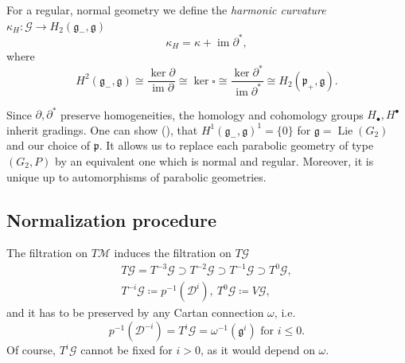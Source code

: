 \documentclass{amsart}
\theoremstyle{plain}
\theoremstyle{definition}
\theoremstyle{remark}
\newcommand{\mc}[1]{\mathcal{#1}}
\newcommand{\mfk}[1]{\mathfrak{#1}}
\newcommand{\on}[1]{\operatorname{#1}}
\begin{document}
For a regular, normal geometry we define the \emph{harmonic curvature} $\kappa_H\colon \mc{G} \to H_2(\mfk{g}_-,\mfk{g})$
\begin{equation}
    \kappa_H = \kappa + \on{im} \partial^*,
\end{equation}
where
\begin{equation*}
    H^2(\mfk{g}_-,\mfk{g}) \cong \frac{\ker \partial}{\on{im} \partial} \cong \ker \square \cong \frac{\ker \partial^*}{\on{im} \partial^*} \cong H_2(\mfk{p}_+,\mfk{g}).
\end{equation*}

Since $\partial,\partial^*$ preserve homogeneities, the homology and cohomology groups $H_\bullet, H^\bullet$ inherit gradings. One can show (\cite[p.]{dt2022}), that $H^1(\mfk{g}_-, \mfk{g})^1 = \{0\}$ for $\mfk{g} = \on{Lie}(G_2)$ and our choice of $\mfk{p}$. It allows us to replace each parabolic geometry of type $(G_2,P)$ by an equivalent one which is normal and regular. Moreover, it is unique up to automorphisms of parabolic geometries.

\subsection{Normalization procedure} \label{section:normalization_procedure}

The filtration on $T\mc{M}$ induces the filtration on $T\mc{G}$
\begin{equation}\label{filtration_on_TG}
\begin{gathered}
    T\mc{G} = T^{-3}\mc{G} \supset T^{-2}\mc{G} \supset T^{-1}\mc{G} \supset T^0\mc{G},\\
    T^{-i}\mc{G} \coloneqq p^{-1}(\mc{D}^i),\ T^0\mc{G} \coloneqq V\mc{G},
\end{gathered}
\end{equation}
and it has to be preserved by any Cartan connection $\omega$, i.e.
\[ p^{-1}(\mc{D}^{-i}) = T^i\mc{G} = \omega^{-1}(\mfk{g}^i) \text{ for } i\leq 0. \]
Of course, $T^i\mc{G}$ cannot be fixed for $i > 0$, as it would depend on $\omega$.
\end{document}

